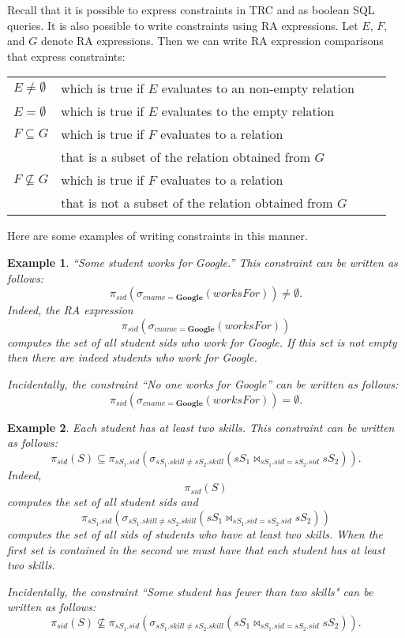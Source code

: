 \documentclass[11pt]{article}
\newcommand{\blue}[1]{{\color{blue}#1}}
\newtheorem{example}{Example}
\begin{document}
Recall that it is possible to express constraints in TRC and as boolean SQL queries.
It is also possible to write constraints using RA expressions.
Let $E$, $F$, and $G$  denote RA expressions. Then we can write RA expression comparisons that express constraints:
\begin{center}
\begin{tabular}{llll}
$E \not=\emptyset$ & which is true if $E$ evaluates to an \blue{non-empty} relation \\
$E = \emptyset$ & which is true if $E$ evaluates to the \blue{empty} relation \\
$F \subseteq G$ & which is true if $F$ evaluates to a relation \\
&that is a \blue{subset} of the relation obtained from $G$\\ 
$F \not\subseteq G$ & which is true if $F$ evaluates to a relation \\
&that is \blue{not} a \blue{subset} of the relation obtained from $G$\\ 
\end{tabular}
\end{center}

Here are some examples of writing constraints in this manner.

\begin{example}\label{constraintOne}
``\emph{Some student works for Google}.''  This constraint can be written as follows:
\[\pi_{sid}(\sigma_{cname = \mathbf{Google}}(worksFor)) \neq \emptyset.
\]
Indeed,  the RA expression \[\pi_{sid}(\sigma_{cname = \mathbf{Google}}(worksFor))\]
computes the set of all student sids who work for Google.   If this set is not empty then there
are indeed students who work for Google.

Incidentally, the constraint ``\emph{No one works for Google}'' can be written as follows:
\[\pi_{sid}(\sigma_{cname = \mathbf{Google}}(worksFor)) = \emptyset.
\]
\end{example}

\begin{example}\label{constraintTwo}
\emph{Each student has at least two skills}.   This constraint can be written as follows:
\[\pi_{sid}(S) \subseteq \pi_{sS_1.sid}(\sigma_{sS_1.skill \neq sS_2.skill}(sS_1\bowtie_{sS_1.sid = sS_2.sid} sS_2)).
\]
Indeed, \[\pi_{sid}(S)\] computes the set of all student sids and
\[\pi_{sS_1.sid}(\sigma_{sS_1.skill \neq sS_2.skill}(sS_1\bowtie_{sS_1.sid = sS_2.sid} sS_2))\] computes the set of
all sids of students who have at least two skills.    When the first set is contained in the second we must have that each student has at least two skills.

Incidentally, the constraint ``\emph{Some student has fewer than two skills}" can be written as follows:
\[\pi_{sid}(S) \not\subseteq \pi_{sS_1.sid}(\sigma_{sS_1.skill \neq sS_2.skill}(sS_1\bowtie_{sS_1.sid = sS_2.sid} sS_2)).
\]

\end{example}
\end{document}
